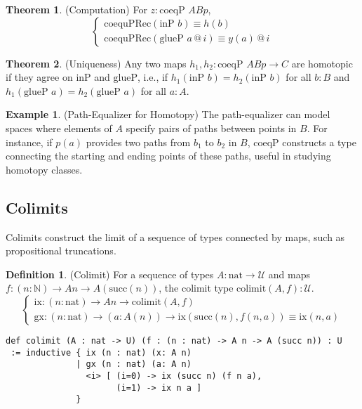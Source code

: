 \documentclass{article}
\theoremstyle{definition}
\newtheorem{theorem}{Theorem}
\newtheorem{definition}{Definition}
\newtheorem{example}{Example}
\begin{document}
\begin{theorem} (Computation)
For $z : \text{coeqP } A B p$,
\[
\begin{cases}
\text{coequPRec}(\text{inP } b) \equiv h(b) \\
\text{coequPRec}(\text{glueP } a \, @ \, i) \equiv y(a) \, @ \, i
\end{cases}
\]
\end{theorem}

\begin{theorem} (Uniqueness)
Any two maps $h_1, h_2 : \text{coeqP } A B p \to C$ are homotopic
if they agree on $\text{inP}$ and $\text{glueP}$, i.e.,
if $h_1(\text{inP } b) = h_2(\text{inP } b)$ for all $b : B$
and $h_1(\text{glueP } a) = h_2(\text{glueP } a)$ for all $a : A$.
\end{theorem}

\begin{example} (Path-Equalizer for Homotopy)
The path-equalizer can model spaces where elements of $A$ specify
pairs of paths between points in $B$. For instance, if $p(a)$ provides
two paths from $b_1$ to $b_2$ in $B$, $\text{coeqP}$ constructs a type
connecting the starting and ending points of these paths,
useful in studying homotopy classes.
\end{example}

\newpage
\subsection{Colimits}
Colimits construct the limit of a sequence of types connected by maps,
such as propositional truncations.

\begin{definition} (Colimit)
For a sequence of types $A : \text{nat} \to \mathcal{U}$ and
maps $f : (n : \mathbb{N}) \to A n \to A(\text{succ}(n))$,
the colimit type $\text{colimit}(A,f) : \mathcal{U}$.
\[
\begin{cases}
\text{ix} : (n : \text{nat}) \to A n \to \text{colimit}(A,f) \\
\text{gx} : (n : \text{nat}) \to (a : A(n)) \to \text{ix} (\text{succ}(n),f(n,a)) \equiv \text{ix}(n,a)
\end{cases}
\]
\begin{lstlisting}
def colimit (A : nat -> U) (f : (n : nat) -> A n -> A (succ n)) : U
 := inductive { ix (n : nat) (x: A n)
              | gx (n : nat) (a: A n)
                <i> [ (i=0) -> ix (succ n) (f n a),
                      (i=1) -> ix n a ]
              }
\end{lstlisting}
\end{definition}
\end{document}
